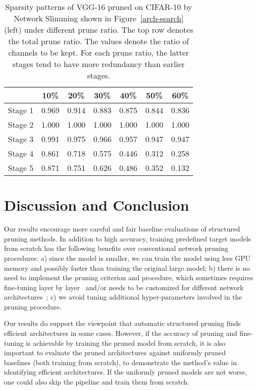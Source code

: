 \setlength{\tabcolsep}{5pt}
\renewcommand{\arraystretch}{1.2}
\begin{table}[!htbp]
\centering
\small
\begin{tabular}{c|cccccc}
\hline
      & 10\%   & 20\%   & 30\%   & 40\%   & 50\%   & 60\%   \\ \hline
Stage 1 & 0.969 & 0.914 & 0.883 & 0.875 & 0.844 &
0.836 \\
Stage 2 & 1.000 & 1.000 & 1.000 & 1.000 & 1.000 &
1.000 \\
Stage 3 & 0.991 & 0.975 & 0.966 & 0.957 & 0.947 & 0.947 \\
Stage 4 & 0.861 & 0.718 & 0.575 & 0.446 & 0.312 & 0.258 \\
Stage 5 & 0.871 & 0.751 & 0.626 & 0.486 & 0.352 & 0.132 \\ \hline
\end{tabular}
    \caption{
      Sparsity patterns of VGG-16 pruned on CIFAR-10 by Network Slimming shown in Figure~\ref{arch-search} (left) under different prune ratio. The top row denotes the total prune ratio. The values denote the ratio of channels to be kept. For each prune ratio, the latter stages tend to have more redundancy than earlier stages.}
     \label{sparsity-2}
\end{table}


\section{Discussion and Conclusion}
Our results encourage more careful and fair baseline evaluations of structured pruning methods. In addition to high accuracy, training predefined target models from scratch has the following benefits over conventional network pruning procedures:
a) since the model is smaller, we can train the model using less GPU memory and possibly faster than training the original large model;
b) there is no need to implement the pruning criterion and procedure, which sometimes  requires fine-tuning layer by layer~\cite{luo2017thinet} and/or needs to be customized for different network architectures~\cite{li2016pruning, liu2017learning};
c) we avoid tuning additional hyper-parameters involved in the pruning procedure.

 Our results do support the viewpoint that  automatic structured pruning finds efficient architectures in some cases. However, if the accuracy of pruning and fine-tuning is achievable by training the pruned model from scratch, it is also important to evaluate the pruned architectures against uniformly pruned baselines (both training from scratch), to demonstrate the method's value in identifying efficient architectures. If the uniformly pruned models are not worse, one could also skip the pipeline and train them from scratch.

